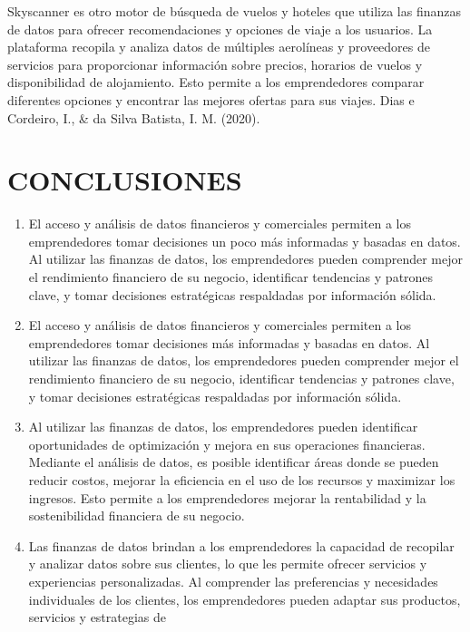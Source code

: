 \documentclass[
  letterpaper,
  DIV=11,
  numbers=noendperiod]{scrreprt}
\begin{document}
Skyscanner es otro motor de búsqueda de vuelos y hoteles que utiliza las
finanzas de datos para ofrecer recomendaciones y opciones de viaje a los
usuarios. La plataforma recopila y analiza datos de múltiples aerolíneas
y proveedores de servicios para proporcionar información sobre precios,
horarios de vuelos y disponibilidad de alojamiento. Esto permite a los
emprendedores comparar diferentes opciones y encontrar las mejores
ofertas para sus viajes. Dias e Cordeiro, I., \& da Silva Batista, I. M.
(2020).

\hypertarget{conclusiones}{%
\section{CONCLUSIONES}\label{conclusiones}}

\begin{enumerate}
\def\labelenumi{\arabic{enumi}.}
\item
  El acceso y análisis de datos financieros y comerciales permiten a los
  emprendedores tomar decisiones un poco más informadas y basadas en
  datos. Al utilizar las finanzas de datos, los emprendedores pueden
  comprender mejor el rendimiento financiero de su negocio, identificar
  tendencias y patrones clave, y tomar decisiones estratégicas
  respaldadas por información sólida.
\item
  El acceso y análisis de datos financieros y comerciales permiten a los
  emprendedores tomar decisiones más informadas y basadas en datos. Al
  utilizar las finanzas de datos, los emprendedores pueden comprender
  mejor el rendimiento financiero de su negocio, identificar tendencias
  y patrones clave, y tomar decisiones estratégicas respaldadas por
  información sólida.
\item
  Al utilizar las finanzas de datos, los emprendedores pueden
  identificar oportunidades de optimización y mejora en sus operaciones
  financieras. Mediante el análisis de datos, es posible identificar
  áreas donde se pueden reducir costos, mejorar la eficiencia en el uso
  de los recursos y maximizar los ingresos. Esto permite a los
  emprendedores mejorar la rentabilidad y la sostenibilidad financiera
  de su negocio.
\item
  Las finanzas de datos brindan a los emprendedores la capacidad de
  recopilar y analizar datos sobre sus clientes, lo que les permite
  ofrecer servicios y experiencias personalizadas. Al comprender las
  preferencias y necesidades individuales de los clientes, los
  emprendedores pueden adaptar sus productos, servicios y estrategias de

\end{enumerate}
\end{document}
